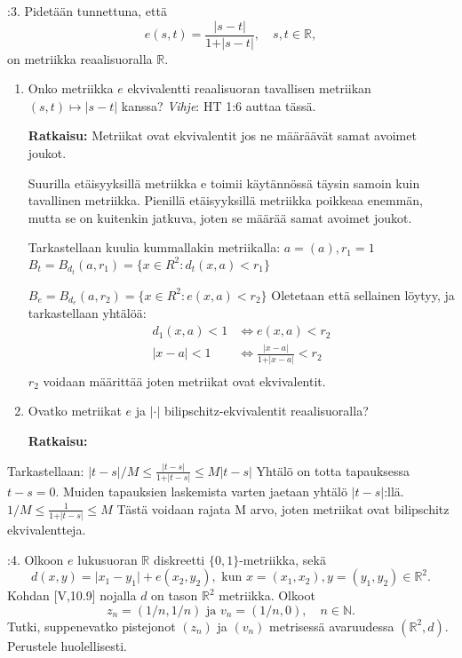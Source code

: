 \documentclass[12pt,a4paper,leqno]{amsart}
\begin{document}
:3. Pidetään tunnettuna, että 
\[
e(s,t) = \frac{\vert s-t\vert}{1+\vert s-t\vert}, \quad s,t \in \mathbb R,
\]
on metriikka reaalisuoralla $\mathbb R$.
\begin{enumerate}
\item Onko metriikka $e$ ekvivalentti 
reaalisuoran tavallisen metriikan $(s,t) \mapsto \vert s-t\vert$ kanssa?
\textit{Vihje}: HT 1:6 auttaa tässä.

\textbf{Ratkaisu:}
Metriikat ovat ekvivalentit jos ne määräävät samat avoimet joukot. 

Suurilla etäisyyksillä metriikka e toimii käytännössä täysin samoin kuin tavallinen metriikka. Pienillä etäisyyksillä metriikka poikkeaa enemmän, mutta se on kuitenkin jatkuva, joten se määrää samat avoimet joukot.

Tarkastellaan kuulia kummallakin metriikalla:
$a = (a), r_1 = 1$
$B_t = B_{d_t}(a, r_1) = \{x \in R^2 : d_t(x, a) < r_1\}$

$B_e = B_{d_e}(a, r_2) = \{x \in R^2 : e(x, a) < r_2\} $
Oletetaan että sellainen löytyy, ja tarkastellaan yhtälöä:
\begin{align*}
    d_1(x, a) < 1 &\iff e(x, a) < r_2 \\
    \vert x - a \vert < 1 &\iff \frac{\vert x-a\vert}{1+\vert x-a\vert} < r_2\\
\end{align*}    
$r_2$ voidaan määrittää joten metriikat ovat ekvivalentit.
\item Ovatko metriikat $e$ ja $\vert \cdot \vert$ bilipschitz-ekvivalentit reaalisuoralla?

\textbf{Ratkaisu:}
\end{enumerate}
Tarkastellaan:
$|t - s|/M \leq \frac{\vert t-s\vert}{1+\vert t-s\vert} \leq M |t - s|$
Yhtälö on totta tapauksessa $t-s = 0$. Muiden tapauksien laskemista varten jaetaan yhtälö $|t-s|$:llä.
$1/M \leq \frac{1}{1+\vert t-s\vert} \leq M $
Tästä voidaan rajata M arvo, joten metriikat ovat bilipschitz ekvivalentteja.
\bigskip

:4.  Olkoon $e$ lukusuoran $\mathbb R$ diskreetti 
$\{0,1\}$-metriikka, sekä 
\[
d(x,y) = \vert x_1 - y_1\vert + e(x_2, y_2), \textrm{ kun }  x = (x_1,x_2), y = (y_1,y_2) 
\in \mathbb R^2.
\]
Kohdan [V,10.9] nojalla $d$ on tason $\mathbb R^2$ metriikka.  Olkoot 
\[
z_n = (1/n,1/n) \textrm{ ja } v_n = (1/n,0), \quad n \in \mathbb N.
\]
 Tutki, suppenevatko pistejonot 
$(z_n)$ ja $(v_n)$ metrisessä avaruudessa $(\mathbb R^2,d)$. Perustele huolellisesti.
\end{document}

